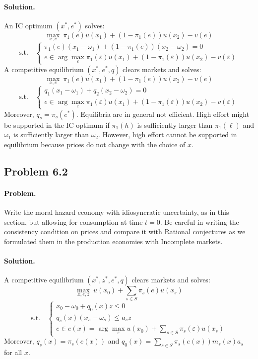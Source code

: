\paragraph{Solution.}
An IC optimum $(x^*, e^*)$ solves:
\[
\max_{x, e} \ \pi_1(e) u(x_1) + (1 - \pi_1(e)) u(x_2) - v(e)
\]
\[
\text{s.t.} \quad
\begin{cases}
\pi_1(e) (x_1 - \omega_1) + (1 - \pi_1(e)) (x_2 - \omega_2) = 0 \\
e \in \arg\max_\varepsilon \pi_1(\varepsilon) u(x_1) + (1 - \pi_1(\varepsilon)) u(x_2) - v(\varepsilon)
\end{cases}
\]
A competitive equilibrium $(x^*, e^*, q)$ clears markets and solves:
\[
\max_{x, e} \ \pi_1(e) u(x_1) + (1 - \pi_1(e)) u(x_2) - v(e)
\]
\[
\text{s.t.} \quad
\begin{cases}
q_1 (x_1 - \omega_1) + q_2 (x_2 - \omega_2) = 0 \\
e \in \arg\max_\varepsilon \pi_1(\varepsilon) u(x_1) + (1 - \pi_1(\varepsilon)) u(x_2) - v(\varepsilon)
\end{cases}
\]
Moreover, $q_s = \pi_s(e^*)$. Equilibria are in general not efficient. High effort might be supported in the IC optimum if $\pi_1(h)$ is sufficiently larger than $\pi_1(\ell)$ and $\omega_1$ is sufficiently larger than $\omega_2$. However, high effort cannot be supported in equilibrium because prices do not change with the choice of $x$.

\subsection{Problem 6.2}
\paragraph{Problem.} Write the moral hazard economy with idiosyncratic uncertainty, as in this section, but allowing for consumption at time $t = 0$. Be careful in writing the consistency condition on prices and compare it with Rational conjectures as we formulated them in the production economies with Incomplete markets.

\paragraph{Solution.}
A competitive equilibrium $(x^*, z^*, e^*, q)$ clears markets and solves:
\[
\max_{x, e, z} \ u(x_0) + \sum_{s \in S} \pi_s(e) u(x_s)
\]
\[
\text{s.t.} \quad
\begin{cases}
x_0 - \omega_0 + q_0(x) z \leq 0 \\
q_s(x) (x_s - \omega_s) \leq a_s z \\
e \in e(x) = \arg\max_\varepsilon u(x_0) + \sum_{s \in S} \pi_s(\varepsilon) u(x_s)
\end{cases}
\]
Moreover, $q_s(x) = \pi_s(e(x))$ and $q_0(x) = \sum_{s \in S} \pi_s(e(x)) m_s(x) a_s$ for all $x$.
